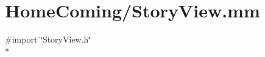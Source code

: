 \hypertarget{_story_view_8mm}{\section{Home\-Coming/\-Story\-View.mm}
\label{_story_view_8mm}
}
{\ttfamily \#import \char`\"{}Story\-View.\-h\char`\"{}}\\*
